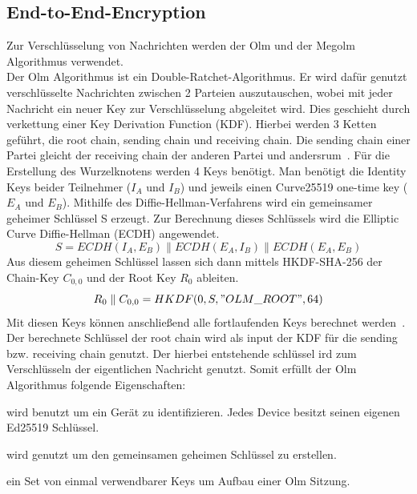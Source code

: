     \subsection{End-to-End-Encryption}\label{subsec:verwendete-schlussel}
    Zur Verschlüsselung von Nachrichten werden der Olm und der Megolm Algorithmus verwendet.\\
    Der Olm Algorithmus ist ein Double-Ratchet-Algorithmus.
    Er wird dafür genutzt verschlüsselte Nachrichten zwischen 2 Parteien auszutauschen, wobei mit jeder Nachricht ein neuer Key zur Verschlüsselung abgeleitet wird.
    Dies geschieht durch verkettung einer Key Derivation Function (KDF).
    Hierbei werden 3 Ketten geführt, die root chain, sending chain und receiving chain.
    Die sending chain einer Partei gleicht der receiving chain der anderen Partei und andersrum~\cite{perrin2016double}.
    Für die Erstellung des Wurzelknotens werden 4 Keys benötigt.
    Man benötigt die Identity Keys beider Teilnehmer ($I_A$ und $I_B$) und jeweils einen Curve25519 one-time key ($E_A$ und $E_B$).
    Mithilfe des Diffie-Hellman-Verfahrens wird ein gemeinsamer geheimer Schlüssel S erzeugt.
    Zur Berechnung dieses Schlüssels wird die Elliptic Curve Diffie-Hellman (ECDH) angewendet.
    \begin{displaymath}
        S = ECDH(I_A,E_B)\parallel ECDH(E_A,I_B) \parallel ECDH(E_A,E_B)
    \end{displaymath}
    Aus diesem geheimen Schlüssel lassen sich dann mittels HKDF-SHA-256 der Chain-Key $C_{0,0}$ und der Root Key $R_0$ ableiten.
    \begin{displaymath}
        R_0 \parallel C_{0,0} = HKDF(0,S,"OLM\_ROOT",64)
    \end{displaymath}
    Mit diesen Keys können anschließend alle fortlaufenden Keys berechnet werden~\cite{olm}.
    Der berechnete Schlüssel der root chain wird als input der KDF für die sending bzw. receiving chain genutzt.
    Der hierbei entstehende schlüssel ird zum Verschlüsseln der eigentlichen Nachricht genutzt.
    Somit erfüllt der Olm Algorithmus folgende Eigenschaften:
    \begin{description}[leftmargin=!,labelwidth=3cm]
        \item [Resilience] wird benutzt um ein Gerät zu identifizieren. Jedes Device besitzt seinen eigenen Ed25519 Schlüssel.
        \item [Forward security] wird genutzt um den gemeinsamen geheimen Schlüssel zu erstellen.
        \item [Break-in recovery] ein Set von einmal verwendbarer Keys um Aufbau einer Olm Sitzung.
    \end{description}

